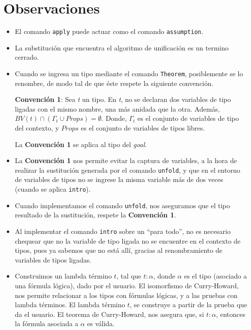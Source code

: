 \documentclass[a4paper,11pt]{article}
\begin{document}
\section{Observaciones}
\begin{itemize}
  \item El comando \texttt{apply} puede actuar como el comando \texttt{assumption}.

  \item La substitución que encuentra el algoritmo de unificación es un termino cerrado.
  
  \item Cuando se ingresa un tipo mediante el comando \texttt{Theorem}, posiblemente se lo renombre, de modo tal de que éste respete la siguiente
  convención.
  
  \textbf{Convención 1}: Sea \textit{t} un tipo. 
  En \textit{t}, no se declaran dos variables de tipo ligadas con el mismo nombre, una más anidada que la otra.
  Además, $BV (t) \cap (\Gamma_{t} \cup Props) = \emptyset$. Donde, $\Gamma_{t}$ es el conjunto de variables de tipo del contexto, y $Props$ es el conjunto
  de variables de tipos libres.
  
  La \textbf{Convención 1} se aplica al tipo del \textit{goal}.
  
  \item La \textbf{Convención 1} nos permite evitar la captura de variables, a la hora de realizar la sustitución generada por el comando \texttt{unfold},
  y que en el entorno de variables de tipos no se ingrese la misma variable más de dos veces (cuando se aplica \texttt{intro}).
 
  \item Cuando implementamos el comando \texttt{unfold}, nos aseguramos que el tipo resultado de la sustitución, respete la \textbf{Convención 1}.
  
  \item Al implementar el comando \texttt{intro} sobre un ``para todo'', no es necesario chequear que no la variable de tipo ligada no se encuentre
  en el contexto de tipos, pues ya sabemos que no está allí, gracias al renombramiento de variables de tipos ligadas.
  
  \item Construimos un lambda término $t$, tal que $t:\alpha$, donde $\alpha$ es el tipo (asociado a una fórmula lógica), dado por el usuario. El isomorfismo
  de Curry-Howard, nos permite relacionar a los tipos con fórmulas lógicas, y a las pruebas con lambda términos.
  El lambda término $t$, se construye a partir de la prueba que da el usuario.
  El teorema de Curry-Howard, nos asegura que, si $t:\alpha$, entonces la fórmula asociada a $\alpha$ es válida.
  

\end{itemize}
\end{document}
